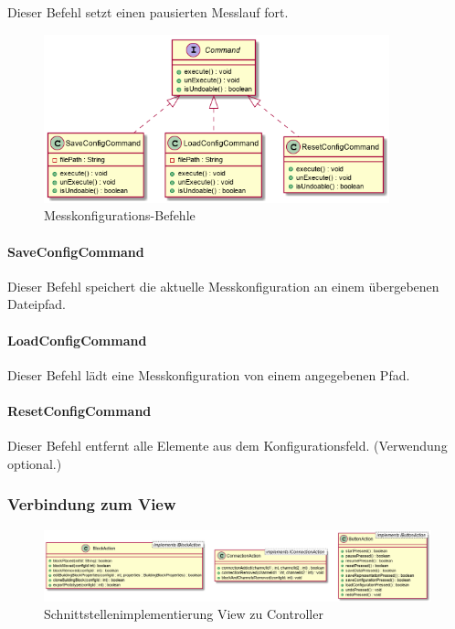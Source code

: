 \documentclass[parskip=full]{scrartcl}
\begin{document}
Dieser Befehl setzt einen pausierten Messlauf fort.

\begin{figure}[htbp]
	\begin{center}
		\includegraphics[width = 10cm]{Grafiken/Commands4.png}
		\caption{Messkonfigurations-Befehle}
		\label{Commands4}
	\end{center}
\end{figure}

\paragraph{SaveConfigCommand}

Dieser Befehl speichert die aktuelle Messkonfiguration an einem übergebenen Dateipfad.

\paragraph{LoadConfigCommand}

Dieser Befehl lädt eine Messkonfiguration von einem angegebenen Pfad.

\paragraph{ResetConfigCommand}

Dieser Befehl entfernt alle Elemente aus dem Konfigurationsfeld. (Verwendung optional.)

\subsubsection{Verbindung zum View}

\begin{figure}[htbp]
	\begin{center}
		\includegraphics[width = 14cm]{Grafiken/View_Controller_Interface.png}
		\caption{Schnittstellenimplementierung View zu Controller}
		\label{View_Controller_Interface}
	\end{center}
\end{figure}
\end{document}
